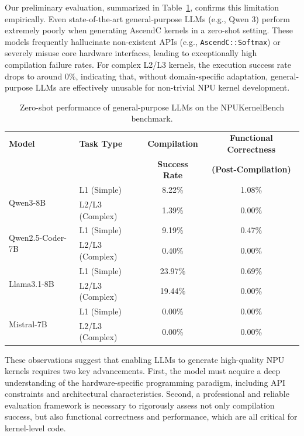 Our preliminary evaluation, summarized in Table~\ref{tab:zero_shot_perf}, confirms this limitation empirically. Even state-of-the-art general-purpose LLMs (e.g., Qwen 3) perform extremely poorly when generating AscendC kernels in a zero-shot setting. These models frequently hallucinate non-existent APIs (e.g., \texttt{AscendC::Softmax}) or severely misuse core hardware interfaces, leading to exceptionally high compilation failure rates. For complex L2/L3 kernels, the execution success rate drops to around 0\%, indicating that, without domain-specific adaptation, general-purpose LLMs are effectively unusable for non-trivial NPU kernel development.

\begin{table}[htbp]
  \centering
  \caption{Zero-shot performance of general-purpose LLMs on the NPUKernelBench benchmark.}
  \label{tab:zero_shot_perf}
  \begin{tabular}{llcc}
    \toprule
    \textbf{Model} & \textbf{Task Type} & \textbf{Compilation} & \textbf{Functional Correctness} \\
     & & \textbf{Success Rate} & \textbf{(Post-Compilation)} \\
    \midrule
    \multirow{2}{*}{Qwen3-8B} & L1 (Simple) & 8.22\% & 1.08\% \\
     & L2/L3 (Complex) & 1.39\% & 0.00\% \\ \hline
     \multirow{2}{*}{Qwen2.5-Coder-7B} & L1 (Simple) & 9.19\% & 0.47\% \\
     & L2/L3 (Complex) & 0.40\% & 0.00\% \\ \hline
     \multirow{2}{*}{Llama3.1-8B} & L1 (Simple) & 23.97\% & 0.69\% \\
     & L2/L3 (Complex) & 19.44\% & 0.00\% \\ \hline
     \multirow{2}{*}{Mistral-7B} & L1 (Simple) & 0.00\% & 0.00\% \\
     & L2/L3 (Complex) & 0.00\% & 0.00\% \\
    \bottomrule
  \end{tabular}
\end{table}

These observations suggest that enabling LLMs to generate high-quality NPU kernels requires two key advancements. First, the model must acquire a deep understanding of the hardware-specific programming paradigm, including API constraints and architectural characteristics. Second, a professional and reliable evaluation framework is necessary to rigorously assess not only compilation success, but also functional correctness and performance, which are all critical for kernel-level code.

